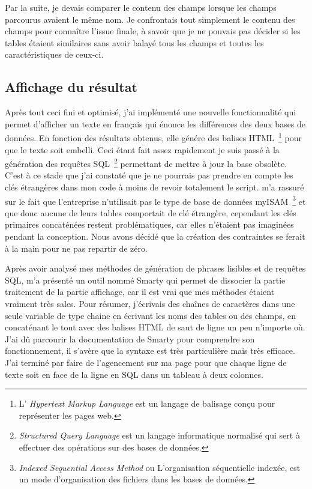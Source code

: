 Par la suite, je devais comparer le contenu des champs lorsque les
champs parcourus avaient le même nom. Je confrontais tout simplement le
contenu des champs pour connaître l'issue finale, à savoir que je ne
pouvais pas décider si les tables étaient similaires sans avoir balayé
tous les champs et toutes les caractéristiques de ceux-ci.

\subsection{Affichage du résultat} %
\label{sub:Affichage du résultat}

Après tout ceci fini et optimisé, j'ai implémenté une nouvelle
fonctionnalité qui permet d'afficher un texte en français qui énonce les
différences des deux bases de données. En fonction des résultats
obtenus, elle génére des balises HTML\, \footnote{L’ \emph{Hypertext
Markup Language} est un langage de balisage conçu pour représenter les
pages web.} pour que le texte soit embelli. Ceci étant fait assez
rapidement je suis passé à la génération des requêtes SQL\,
\footnote{\emph{Structured Query Language} est un langage informatique
normalisé qui sert à effectuer des opérations sur des bases de données.}
permettant de mettre à jour la base obsolète. C'est à ce stade que j'ai
constaté que je ne pourrais pas prendre en compte les clés étrangères
dans mon code à moins de revoir totalement le script.  
m'a rassuré sur le fait que l'entreprise n'utilisait pas le type de base
de données myISAM\, \footnote{\emph{Indexed Sequential Access Method} ou
L'organisation séquentielle indexée, est un mode d'organisation des
fichiers dans les bases de données.} et que donc aucune de leurs tables
comportait de clé étrangère, cependant les clés primaires concaténées
restent problématiques, car elles n'étaient pas imaginées pendant la
conception. Nous avons décidé que la création des contraintes se ferait
à la main pour ne pas repartir de zéro.

Après avoir analysé mes méthodes de génération de phrases lisibles et de
requêtes SQL,  m'a présenté un outil nommé \og Smarty
\fg{} qui permet de dissocier la partie traitement de la partie
affichage, car il est vrai que mes méthodes étaient vraiment très sales.
Pour résumer, j'écrivais des chaînes de caractères dans une seule
variable de type chaine en écrivant les noms des tables ou des champs,
en concaténant le tout avec des balises HTML de saut de ligne un peu
n'importe où. J'ai dû parcourir la documentation de Smarty pour
comprendre son fonctionnement, il s'avère que la syntaxe est très
particulière mais très efficace. J'ai terminé par faire de l'agencement
sur ma page pour que chaque ligne de texte soit en face de la ligne
en SQL dans un tableau à deux colonnes.\\

